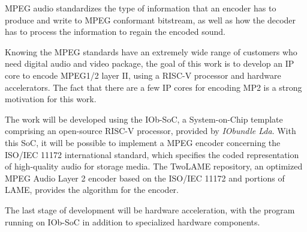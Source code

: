 
\indent MPEG audio standardizes the type of information that an encoder has to produce and write to MPEG conformant bitstream, as well as how the decoder has to process the information to regain the encoded sound.

Knowing the MPEG standards have an extremely wide range of customers who need digital audio and video package, the goal of this work is to develop an IP core to encode MPEG1/2 layer II, using a RISC-V processor and hardware accelerators. The fact that there are a few IP cores for encoding MP2 is a strong motivation for this work.

The work will be developed using the IOb-SoC, a System-on-Chip template comprising an open-source RISC-V processor, provided by \textit{IObundle Lda}. 
With this SoC, it will be possible to implement a MPEG encoder concerning the ISO/IEC 11172 international standard, which specifies the coded representation of high-quality audio for storage media. The TwoLAME repository, an optimized MPEG Audio Layer 2 encoder based on the ISO/IEC 11172 and portions of LAME, provides the algorithm for the encoder.

The last stage of development will be hardware acceleration, with the program running on IOb-SoC in addition to specialized hardware components.